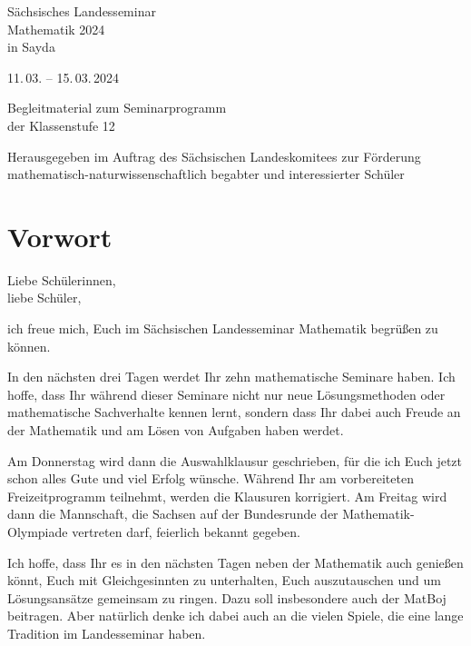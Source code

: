 \documentclass[a4paper, 12pt]{article}
\begin{document}
	\begin{titlepage}
		\centering\sffamily\Huge\bfseries
		\vspace*{0.75em}
		
		Sächsisches Landesseminar \\
		Mathematik 2024 \\
		\textmd{in Sayda} \\
		
		\vspace{1.75em}
		
		\textmd{\large 11.\,03. -- 15.\,03.\,2024} \\
		
		\vspace{6em}
		
		Begleitmaterial zum Seminarprogramm\\[.6\baselineskip]
		der Klassenstufe 12\\
		
		\vfill
		
		\raggedright\normalfont\normalsize
		Herausgegeben im Auftrag des Sächsischen Landeskomitees zur Förderung \\
		mathematisch-naturwissenschaftlich begabter und interessierter Schüler
	\end{titlepage}
	\setcounter{page}{2}
	
	\section*{Vorwort}
	
	Liebe Schülerinnen,\\
	liebe Schüler,
	
	ich freue mich, Euch im Sächsischen Landesseminar Mathematik begrüßen zu können.
	
	In den nächsten drei Tagen werdet Ihr zehn mathematische Seminare haben. Ich hoffe, dass Ihr während dieser Seminare nicht nur neue Lösungsmethoden oder mathematische Sachverhalte kennen lernt, sondern dass Ihr dabei auch Freude an der Mathematik und am Lösen von Aufgaben haben werdet.
	
	Am Donnerstag wird dann die Auswahlklausur geschrieben, für die ich Euch jetzt schon alles Gute und viel Erfolg wünsche. Während Ihr am vorbereiteten Freizeitprogramm teilnehmt, werden die Klausuren korrigiert. Am Freitag wird dann die Mannschaft, die Sachsen auf der Bundesrunde der Mathematik-Olympiade vertreten darf, feierlich bekannt gegeben.
	
	Ich hoffe, dass Ihr es in den nächsten Tagen neben der Mathematik auch genießen könnt, Euch mit Gleichgesinnten zu unterhalten, Euch auszutauschen und um Lösungsansätze gemeinsam zu ringen. Dazu soll insbesondere auch der MatBoj beitragen. Aber natürlich denke ich dabei auch an die vielen Spiele, die eine lange Tradition im Landesseminar haben.
	
\end{document}
